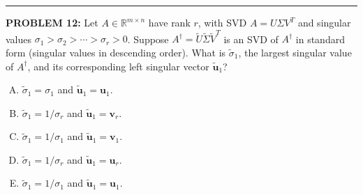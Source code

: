 \documentclass[12pt]{amsart}
\newcommand{\divider}{
  \vspace{-1em} %
  \noindent
  \raisebox{-0.15ex}{\textbullet}%
  \hspace{0.5em}%
  \rule[0.5ex]{0.95\textwidth}{1.0pt}%
  \hspace{0.5em}%
  \raisebox{-0.15ex}{\textbullet}%
  \vspace{0em} %
}
\begin{document}
\divider

{\bf PROBLEM 12:}
Let $A \in \mathbb{R}^{m \times n}$ have rank $r$, with SVD $A = U\Sigma V^T$ and singular
values $\sigma_1 > \sigma_2 > \cdots > \sigma_r > 0$.
Suppose $A^\dagger = \tilde U \tilde\Sigma \tilde V^T$ is an SVD of $A^\dagger$
in standard form (singular values in descending order).
What is $\tilde\sigma_1$, the largest singular value of $A^\dagger$, and its
corresponding left singular vector $\tilde{\mathbf{u}}_1$?
\begin{enumerate}[(A)]
\item $\tilde\sigma_1 = \sigma_1$ and $\tilde{\mathbf{u}}_1 = \mathbf{u}_1$.
\item $\tilde\sigma_1 = 1/\sigma_r$ and $\tilde{\mathbf{u}}_1 = \mathbf{v}_r$.
\item $\tilde\sigma_1 = 1/\sigma_1$ and $\tilde{\mathbf{u}}_1 = \mathbf{v}_1$.
\item $\tilde\sigma_1 = 1/\sigma_r$ and $\tilde{\mathbf{u}}_1 = \mathbf{u}_r$.
\item $\tilde\sigma_1 = 1/\sigma_1$ and $\tilde{\mathbf{u}}_1 = \mathbf{u}_1$.
\end{enumerate}
%
%
\end{document}
